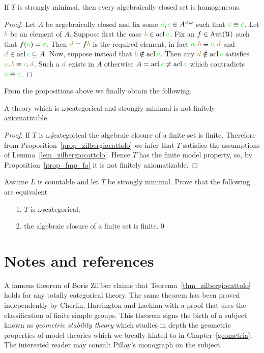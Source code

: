\documentclass[creche.tex]{subfiles}
\begin{document}
\begin{proposition}\label{prop_zilbergiocattolo} If $T$ is strongly minimal, then every algebraically closed set is homogeneous.
\end{proposition}
\begin{proof}
Let $A$ be argebraically closed and fix some ${\color{green} a},{\color{green} c}\in A^{<\omega}$ such that ${\color{green} a}\equiv{\color{green}c}$. Let ${\color{brown} b}$ be an element of $A$. Suppose first the case ${\color{brown} b}\in\mathop{\rm acl}{\color{green} a}$. Fix an $f\in\textrm{Aut\kern.15ex}(\EuScript U)$ such that $f({\color{green} a})={\color{green} c}$. Then ${\color{brown} d}=f{\color{brown} b}$ is the required element, in fact ${\color{green} a},{\color{brown} b}\equiv {\color{green}c},{\color{brown} d}$ and ${\color{brown} d}\in\mathop{\rm acl}{\color{green} c}\subseteq  A$. Now, suppose instead that ${\color{brown} b}\notin\mathop{\rm acl}{\color{green} a}$. Then any ${\color{brown} d}\notin\mathop{\rm acl}{\color{green} c}$ satisfies ${\color{green} a},{\color{brown} b}\equiv {\color{green}c},{\color{brown} d}$. Such a ${\color{brown} d}$ exists in $A$ otherwise $A=\mathop{\rm acl}{\color{green} c}\neq\mathop{\rm acl}{\color{green} a}$ which contradicts ${\color{green} a}\equiv {\color{green}c}$.
\end{proof}

From the propositions above we finally obtain the following.

\begin{theorem}\label{thm_zilbergiocattolo}
A theory which is $\omega\jj$categorical and strongly minimal is not finitely axiomatizable.
\end{theorem}

\begin{proof}
If $T$ is $\omega\jj$categorical the algebraic closure of a finite set is finite. Therefore from Proposition~\ref{prop_zilbergiocattolo} we infer that $T$ satisfies the assumptions of Lemma~\ref{lem_zilbergiocattolo}. Hence $T$ has the finite model property, so, by Proposition~\ref{prop_fmp_fa} it is not finitely axiomatizable.
\end{proof}


\begin{exercise} 
Assume $L$ is countable and let $T$ be strongly minimal. Prove that the following are equivalent
\begin{itemize}
\item[1.] $T$ is $\omega\jj$categorical;
\item[2.] the algebraic closure of a finite set is finite.\qed
\end{itemize}
\end{exercise}




\section{Notes and references}
A famous theorem of Boris Zil'ber claims that Teorema~\ref{thm_zilbergiocattolo} holds for any totally categorical theory. The same theorem has been proved independently by  Cherlin, Harrington and Lachlan with a proof that uses the classification of finite simple groups. This theorem signs the birth of a subject known as \textit{geometric stability theory\/} which studies in depth the geometric properties of model theories which we breafly hinted to in Chapter~\ref{geometria}. The interested reader may consult Pillay's monograph on the subject.
\end{document}
